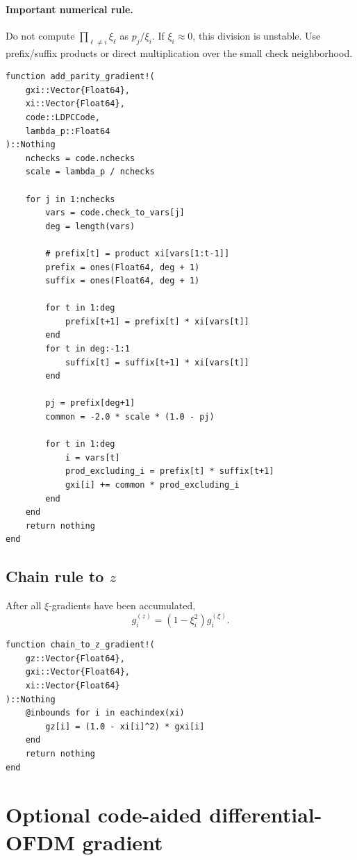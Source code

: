 \documentclass[11pt]{article}
\begin{document}
\paragraph{Important numerical rule.}
Do not compute $\prod_{\ell\ne i}\xi_\ell$ as $p_j/\xi_i$.  If $\xi_i\approx0$, this division is unstable.  Use prefix/suffix products or direct multiplication over the small check neighborhood.

\begin{lstlisting}
function add_parity_gradient!(
    gxi::Vector{Float64},
    xi::Vector{Float64},
    code::LDPCCode,
    lambda_p::Float64
)::Nothing
    nchecks = code.nchecks
    scale = lambda_p / nchecks

    for j in 1:nchecks
        vars = code.check_to_vars[j]
        deg = length(vars)

        # prefix[t] = product xi[vars[1:t-1]]
        prefix = ones(Float64, deg + 1)
        suffix = ones(Float64, deg + 1)

        for t in 1:deg
            prefix[t+1] = prefix[t] * xi[vars[t]]
        end
        for t in deg:-1:1
            suffix[t] = suffix[t+1] * xi[vars[t]]
        end

        pj = prefix[deg+1]
        common = -2.0 * scale * (1.0 - pj)

        for t in 1:deg
            i = vars[t]
            prod_excluding_i = prefix[t] * suffix[t+1]
            gxi[i] += common * prod_excluding_i
        end
    end
    return nothing
end
\end{lstlisting}

\subsection{Chain rule to $z$}

After all $\xi$-gradients have been accumulated,
\begin{equation}
 g_i^{(z)}=(1-\xi_i^2)g_i^{(\xi)}.
\label{eq:chain}
\end{equation}

\begin{lstlisting}
function chain_to_z_gradient!(
    gz::Vector{Float64},
    gxi::Vector{Float64},
    xi::Vector{Float64}
)::Nothing
    @inbounds for i in eachindex(xi)
        gz[i] = (1.0 - xi[i]^2) * gxi[i]
    end
    return nothing
end
\end{lstlisting}

\section{Optional code-aided differential-OFDM gradient}
\label{sec:diff-gradient}
\end{document}
